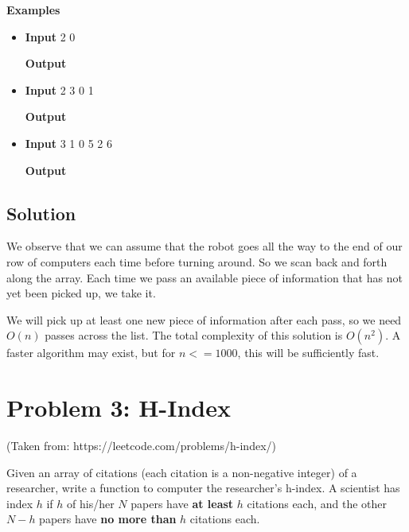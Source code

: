 \normalfont\documentclass[letterpaper,11pt]{article}
\begin{document}
\textbf{Examples} \newline
\begin{itemize}
\item \textbf{Input}   2 0

\textbf{Output} 

\item \textbf{Input}   2 3 0 1

\textbf{Output} 

\item \textbf{Input}   3 1 0 5 2 6

\textbf{Output} 
\end{itemize}

\subsection*{Solution}
We observe that we can assume that the robot goes all the way to the end of our row of computers each time before turning around. So we scan back and forth along the array. Each time we pass an available piece of information that has not yet been picked up, we take it.

We will pick up at least one new piece of information after each pass, so we need $O(n)$ passes across the list. The total complexity of this solution is $O(n^2)$. A faster algorithm may exist, but for $n <= 1000$, this will be sufficiently fast. \newline

\section*{Problem 3: H-Index}
(Taken from: https://leetcode.com/problems/h-index/)

Given an array of citations (each citation is a non-negative integer) of a researcher, write a function to computer the researcher's h-index. A scientist has index $h$ if $h$ of his/her $N$ papers have \textbf{at least} $h$ citations each, and the other $N - h$ papers have \textbf{no more than} $h$ citations each.
\end{document}
